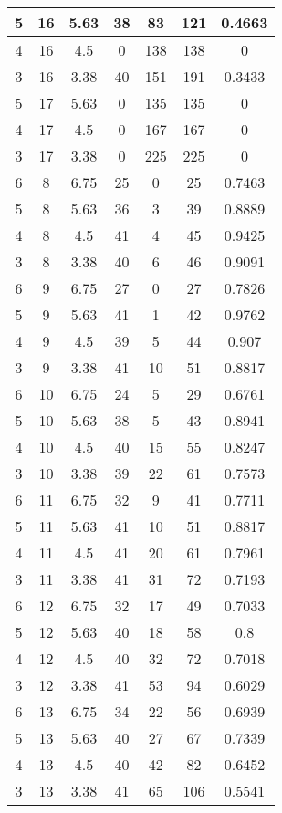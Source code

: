 \documentclass[letterpaper, 12pt]{article}
\begin{document}
\begin{longtable}{|c|c|c|c|c|c|c|}
\hline
5 & 16 & 5.63 & 38 & 83 & 121 & 0.4663 \\
\hline
4 & 16 & 4.5 & 0 & 138 & 138 & 0 \\
\hline
3 & 16 & 3.38 & 40 & 151 & 191 & 0.3433 \\
\hline
5 & 17 & 5.63 & 0 & 135 & 135 & 0 \\
\hline
4 & 17 & 4.5 & 0 & 167 & 167 & 0 \\
\hline
3 & 17 & 3.38 & 0 & 225 & 225 & 0 \\
\hline
6 & 8 & 6.75 & 25 & 0 & 25 & 0.7463 \\
\hline
5 & 8 & 5.63 & 36 & 3 & 39 & 0.8889 \\
\hline
4 & 8 & 4.5 & 41 & 4 & 45 & 0.9425 \\
\hline
3 & 8 & 3.38 & 40 & 6 & 46 & 0.9091 \\
\hline
6 & 9 & 6.75 & 27 & 0 & 27 & 0.7826 \\
\hline
5 & 9 & 5.63 & 41 & 1 & 42 & 0.9762 \\
\hline
4 & 9 & 4.5 & 39 & 5 & 44 & 0.907 \\
\hline
3 & 9 & 3.38 & 41 & 10 & 51 & 0.8817 \\
\hline
6 & 10 & 6.75 & 24 & 5 & 29 & 0.6761 \\
\hline
5 & 10 & 5.63 & 38 & 5 & 43 & 0.8941 \\
\hline
4 & 10 & 4.5 & 40 & 15 & 55 & 0.8247 \\
\hline
3 & 10 & 3.38 & 39 & 22 & 61 & 0.7573 \\
\hline
6 & 11 & 6.75 & 32 & 9 & 41 & 0.7711 \\
\hline
5 & 11 & 5.63 & 41 & 10 & 51 & 0.8817 \\
\hline
4 & 11 & 4.5 & 41 & 20 & 61 & 0.7961 \\
\hline
3 & 11 & 3.38 & 41 & 31 & 72 & 0.7193 \\
\hline
6 & 12 & 6.75 & 32 & 17 & 49 & 0.7033 \\
\hline
5 & 12 & 5.63 & 40 & 18 & 58 & 0.8 \\
\hline
4 & 12 & 4.5 & 40 & 32 & 72 & 0.7018 \\
\hline
3 & 12 & 3.38 & 41 & 53 & 94 & 0.6029 \\
\hline
6 & 13 & 6.75 & 34 & 22 & 56 & 0.6939 \\
\hline
5 & 13 & 5.63 & 40 & 27 & 67 & 0.7339 \\
\hline
4 & 13 & 4.5 & 40 & 42 & 82 & 0.6452 \\
\hline
3 & 13 & 3.38 & 41 & 65 & 106 & 0.5541 \\
\hline

\end{longtable}
\end{document}
